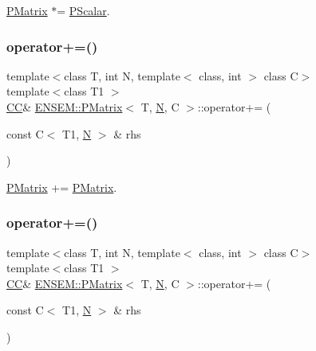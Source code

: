 \mbox{\hyperlink{classENSEM_1_1PMatrix}{P\+Matrix}} $\ast$= \mbox{\hyperlink{classENSEM_1_1PScalar}{P\+Scalar}}. 

\mbox{\label{classENSEM_1_1PMatrix_af6bd651888f2621169845b757b2200ee}} 
\subsubsection{\texorpdfstring{operator+=()}{operator+=()}\hspace{0.1cm}{\footnotesize\ttfamily [1/4]}}
{\footnotesize\ttfamily template$<$class T, int N, template$<$ class, int $>$ class C$>$ \\
template$<$class T1 $>$ \\
\mbox{\hyperlink{classENSEM_1_1PMatrix_a744bac549029029effe32dc1705660ec}{CC}}\& \mbox{\hyperlink{classENSEM_1_1PMatrix}{E\+N\+S\+E\+M\+::\+P\+Matrix}}$<$ T, \mbox{\hyperlink{operator__name__util_8cc_a7722c8ecbb62d99aee7ce68b1752f337}{N}}, C $>$\+::operator+= (\begin{DoxyParamCaption}\item[{const C$<$ T1, \mbox{\hyperlink{operator__name__util_8cc_a7722c8ecbb62d99aee7ce68b1752f337}{N}} $>$ \&}]{rhs }\end{DoxyParamCaption})\hspace{0.3cm}{\ttfamily [inline]}}



\mbox{\hyperlink{classENSEM_1_1PMatrix}{P\+Matrix}} += \mbox{\hyperlink{classENSEM_1_1PMatrix}{P\+Matrix}}. 

\mbox{\label{classENSEM_1_1PMatrix_af6bd651888f2621169845b757b2200ee}} 
\subsubsection{\texorpdfstring{operator+=()}{operator+=()}\hspace{0.1cm}{\footnotesize\ttfamily [2/4]}}
{\footnotesize\ttfamily template$<$class T, int N, template$<$ class, int $>$ class C$>$ \\
template$<$class T1 $>$ \\
\mbox{\hyperlink{classENSEM_1_1PMatrix_a744bac549029029effe32dc1705660ec}{CC}}\& \mbox{\hyperlink{classENSEM_1_1PMatrix}{E\+N\+S\+E\+M\+::\+P\+Matrix}}$<$ T, \mbox{\hyperlink{operator__name__util_8cc_a7722c8ecbb62d99aee7ce68b1752f337}{N}}, C $>$\+::operator+= (\begin{DoxyParamCaption}\item[{const C$<$ T1, \mbox{\hyperlink{operator__name__util_8cc_a7722c8ecbb62d99aee7ce68b1752f337}{N}} $>$ \&}]{rhs }\end{DoxyParamCaption})\hspace{0.3cm}{\ttfamily [inline]}}



